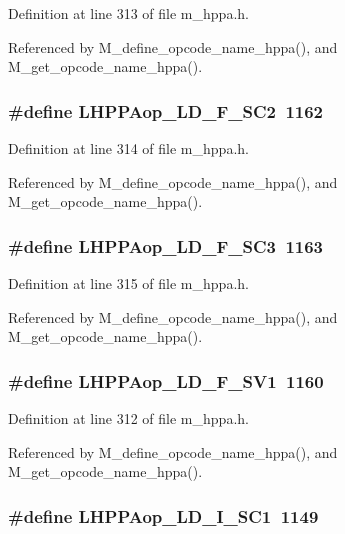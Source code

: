 Definition at line 313 of file m\_\-hppa.h.

Referenced by M\_\-define\_\-opcode\_\-name\_\-hppa(), and M\_\-get\_\-opcode\_\-name\_\-hppa().
\subsubsection{\setlength{\rightskip}{0pt plus 5cm}\#define LHPPAop\_\-LD\_\-F\_\-SC2~1162}\label{m__hppa_8h_04091855ba2f1a3b0b46137ae3736c47}




Definition at line 314 of file m\_\-hppa.h.

Referenced by M\_\-define\_\-opcode\_\-name\_\-hppa(), and M\_\-get\_\-opcode\_\-name\_\-hppa().
\subsubsection{\setlength{\rightskip}{0pt plus 5cm}\#define LHPPAop\_\-LD\_\-F\_\-SC3~1163}\label{m__hppa_8h_9fbf3dc4fb74bd9c9a31b3358be55f94}




Definition at line 315 of file m\_\-hppa.h.

Referenced by M\_\-define\_\-opcode\_\-name\_\-hppa(), and M\_\-get\_\-opcode\_\-name\_\-hppa().
\subsubsection{\setlength{\rightskip}{0pt plus 5cm}\#define LHPPAop\_\-LD\_\-F\_\-SV1~1160}\label{m__hppa_8h_59d8d3f87bc2600d499a6478b50d2e98}




Definition at line 312 of file m\_\-hppa.h.

Referenced by M\_\-define\_\-opcode\_\-name\_\-hppa(), and M\_\-get\_\-opcode\_\-name\_\-hppa().
\subsubsection{\setlength{\rightskip}{0pt plus 5cm}\#define LHPPAop\_\-LD\_\-I\_\-SC1~1149}\label{m__hppa_8h_6b37d9056455173e208381029fd6b0d6}




